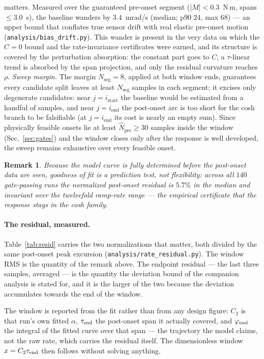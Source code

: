 \documentclass[10pt]{article}
\newtheorem{remark}{Remark}
\begin{document}
matters. Measured over the guaranteed pre-onset segment
($|M| < 0.3$~N\,m, spans $\le 3.0$~s), the baseline wanders by
$3.4$~mrad/s (median; p90 $24$, max $68$) — an upper bound that
conflates true sensor drift with real elastic pre-onset motion
(\texttt{analysis/bias\_drift.py}). This wander is present in the very
data on which the $C = 0$ bound and the rate-invariance certificates
were earned, and its structure is covered by the perturbation
absorption: the constant part goes to $C$, a $\tau$-linear trend is
absorbed by the span projection, and only the residual curvature
reaches $\rho$. \emph{Sweep margin.} The margin
$N_{\mathrm{seg}} = 8$, applied at both window ends, guarantees every
candidate split leaves at least $N_{\mathrm{seg}}$ samples in each
segment; it excises only degenerate candidates: near
$j = i_{\mathrm{start}}$ the baseline would be estimated from a handful
of samples, and near $j = i_{\mathrm{end}}$ the post-onset arc is too
short for the cosh branch to be falsifiable (at
$j = i_{\mathrm{end}}$ its cost is nearly an empty sum).
Since physically feasible onsets lie at least
$\hat N_{\mathrm{pre}} \ge 30$ samples inside the window
(Sec.~\ref{sec:gates}) and the window closes only after the response is
well developed, the sweep remains exhaustive over every feasible onset.

\begin{remark}
Because the model curve is fully determined before the post-onset data
are seen, goodness of fit is a \emph{prediction test}, not flexibility:
across all $140$ gate-passing runs the normalized post-onset residual is
$5.7\%$ in the median and invariant over the twelvefold ramp-rate range
— the empirical certificate that the response stays in the cosh family.
\end{remark}

\paragraph{The residual, measured.}
Table~\ref{tab:resid} carries the two normalizations that matter, both
divided by the same post-onset peak excursion
(\texttt{analysis/rate\_residual.py}). The window RMS is the quantity
of the remark above. The endpoint residual — the last three samples,
averaged — is the quantity the deviation bound of the companion
analysis is stated for, and it is the larger of the two because the
deviation accumulates towards the end of the window.

The window is reported from the fit rather than from any design figure:
$C_2$ is that run's own fitted $\alpha$, $\tau_{\rm end}$ the post-onset
span it actually covered, and $\varphi_{\rm end}$ the integral of the
fitted curve over that span — the trajectory the model claims, not the
raw rate, which carries the residual itself. The dimensionless window
$x = C_2\tau_{\rm end}$ then follows without solving anything.
\end{document}
